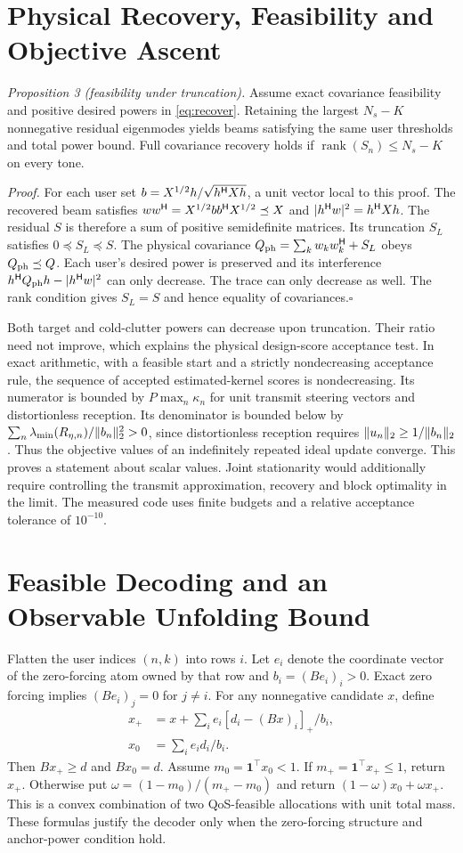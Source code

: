 \section{Physical Recovery, Feasibility and Objective Ascent}\label{ap:recover}
\emph{Proposition 3 (feasibility under truncation).} Assume exact covariance feasibility and positive desired powers in \eqref{eq:recover}. Retaining the largest $N_s-K$ nonnegative residual eigenmodes yields beams satisfying the same user thresholds and total power bound. Full covariance recovery holds if $\operatorname{rank}(S_n)\le N_s-K$ on every tone.
\par\emph{Proof.} For each user set $b=X^{1/2}h/\sqrt{h^{\mathsf H} Xh}$, a unit vector local to this proof. The recovered beam satisfies $ww^{\mathsf H}=X^{1/2}bb^{\mathsf H} X^{1/2}\preceq X$ and $|h^{\mathsf H} w|^2=h^{\mathsf H} Xh$. The residual $S$ is therefore a sum of positive semidefinite matrices. Its truncation $S_L$ satisfies $0\preceq S_L\preceq S$. The physical covariance $Q_{\rm ph}=\sum_k w_kw_k^{\mathsf H}+S_L$ obeys $Q_{\rm ph}\preceq Q$. Each user's desired power is preserved and its interference $h^{\mathsf H} Q_{\rm ph}h-|h^{\mathsf H} w|^2$ can only decrease. The trace can only decrease as well. The rank condition gives $S_L=S$ and hence equality of covariances.\hfill$\square$

Both target and cold-clutter powers can decrease upon truncation. Their ratio need not improve, which explains the physical design-score acceptance test. In exact arithmetic, with a feasible start and a strictly nondecreasing acceptance rule, the sequence of accepted estimated-kernel scores is nondecreasing. Its numerator is bounded by $P\max_n\kappa_n$ for unit transmit steering vectors and distortionless reception. Its denominator is bounded below by $\sum_n\lambda_{\min}(R_{\eta,n})/\lVert b_n\rVert_2^2>0$, since distortionless reception requires $\lVert u_n\rVert_2\ge1/\lVert b_n\rVert_2$. Thus the objective values of an indefinitely repeated ideal update converge. This proves a statement about scalar values. Joint stationarity would additionally require controlling the transmit approximation, recovery and block optimality in the limit. The measured code uses finite budgets and a relative acceptance tolerance of $10^{-10}$.
\section{Feasible Decoding and an Observable Unfolding Bound}\label{ap:decode}
Flatten the user indices $(n,k)$ into rows $i$. Let $e_i$ denote the coordinate vector of the zero-forcing atom owned by that row and $b_i=(Be_i)_i>0$. Exact zero forcing implies $(Be_i)_j=0$ for $j\ne i$. For any nonnegative candidate $x$, define
\begin{align}
 x_+ &=x+\sum_i e_i[d_i-(Bx)_i]_+/b_i,\\
 x_0 &=\sum_i e_i d_i/b_i .
\end{align}
Then $Bx_+\ge d$ and $Bx_0=d$. Assume $m_0=\mathbf1^\top x_0<1$. If $m_+=\mathbf1^\top x_+\le1$, return $x_+$. Otherwise put $\omega=(1-m_0)/(m_+-m_0)$ and return $(1-\omega)x_0+\omega x_+$. This is a convex combination of two QoS-feasible allocations with unit total mass. These formulas justify the decoder only when the zero-forcing structure and anchor-power condition hold.

